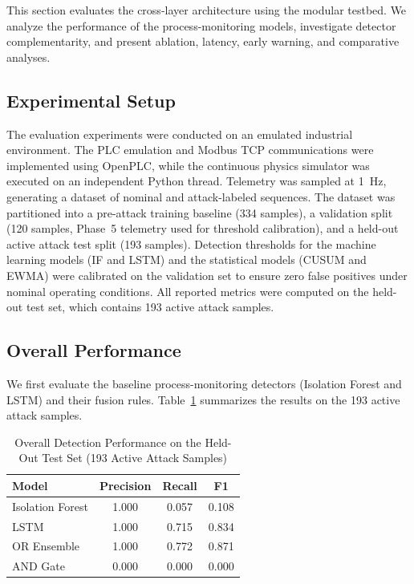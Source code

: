 \documentclass[journal,twoside,web]{ieeecolor}
\begin{document}
This section evaluates the cross-layer architecture using the modular testbed. We analyze the performance of the process-monitoring models, investigate detector complementarity, and present ablation, latency, early warning, and comparative analyses.

\subsection{Experimental Setup} \label{subsec:exp_setup}
The evaluation experiments were conducted on an emulated industrial environment. The PLC emulation and Modbus TCP communications were implemented using OpenPLC, while the continuous physics simulator was executed on an independent Python thread. Telemetry was sampled at 1~Hz, generating a dataset of nominal and attack-labeled sequences. The dataset was partitioned into a pre-attack training baseline (334 samples), a validation split (120 samples, Phase~5 telemetry used for threshold calibration), and a held-out active attack test split (193 samples). Detection thresholds for the machine learning models (IF and LSTM) and the statistical models (CUSUM and EWMA) were calibrated on the validation set to ensure zero false positives under nominal operating conditions. All reported metrics were computed on the held-out test set, which contains 193 active attack samples.

\subsection{Overall Performance} \label{subsec:overall_performance}
We first evaluate the baseline process-monitoring detectors (Isolation Forest and LSTM) and their fusion rules. Table~\ref{tab:overall_performance} summarizes the results on the 193 active attack samples.
\begin{table}[!t]
\caption{Overall Detection Performance on the Held-Out Test Set (193 Active Attack Samples)}
\label{tab:overall_performance}
\centering
\setlength{\tabcolsep}{6pt}
\begin{tabular}{lccc}
\toprule
Model & Precision & Recall & F1 \\
\midrule
Isolation Forest & 1.000 & 0.057 & 0.108 \\
LSTM & 1.000 & 0.715 & 0.834 \\
OR Ensemble & 1.000 & 0.772 & 0.871 \\
AND Gate & 0.000 & 0.000 & 0.000 \\
\bottomrule
\end{tabular}
\end{table}
\end{document}
